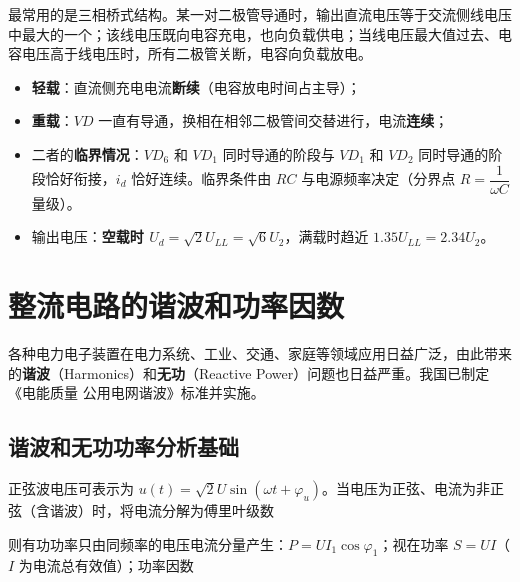 最常用的是三相桥式结构。某一对二极管导通时，输出直流电压等于交流侧线电压中最大的一个；该线电压既向电容充电，也向负载供电；当线电压最大值过去、电容电压高于线电压时，所有二极管关断，电容向负载放电。

\begin{itemize}
  \item \textbf{轻载}：直流侧充电电流\textbf{断续}（电容放电时间占主导）；
  \item \textbf{重载}：$VD$ 一直有导通，换相在相邻二极管间交替进行，电流\textbf{连续}；
  \item 二者的\textbf{临界情况}：$VD_6$ 和 $VD_1$ 同时导通的阶段与 $VD_1$ 和 $VD_2$ 同时导通的阶段恰好衔接，$i_d$ 恰好连续。临界条件由 $RC$ 与电源频率决定（分界点 $R=\dfrac{1}{\omega C}$ 量级）。
  \item 输出电压：\textbf{空载时 $U_d=\sqrt{2}U_{LL}=\sqrt{6}U_2$}，满载时趋近 $1.35U_{LL}=2.34U_2$。
\end{itemize}



\section{整流电路的谐波和功率因数}

各种电力电子装置在电力系统、工业、交通、家庭等领域应用日益广泛，由此带来的\textbf{谐波}（Harmonics）和\textbf{无功}（Reactive Power）问题也日益严重。我国已制定《电能质量 公用电网谐波》标准并实施。

\subsection{谐波和无功功率分析基础}

正弦波电压可表示为 $u(t)=\sqrt{2}U\sin(\omega t+\varphi_u)$。当电压为正弦、电流为非正弦（含谐波）时，将电流分解为傅里叶级数


则有功功率只由同频率的电压电流分量产生：$P=UI_1\cos\varphi_1$；视在功率 $S=UI$（$I$ 为电流总有效值）；功率因数

